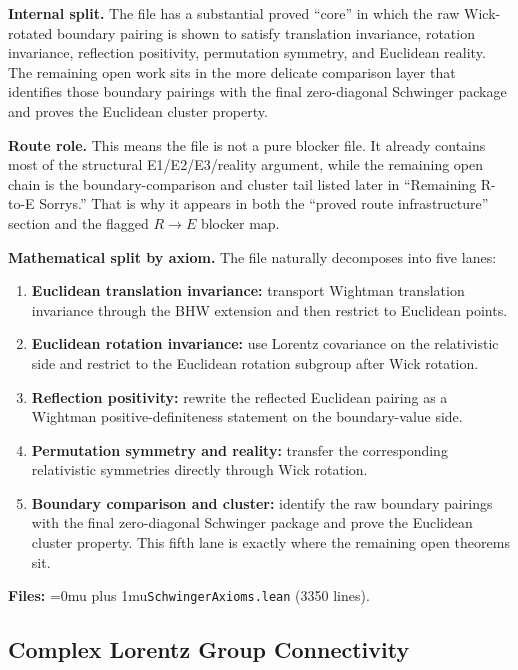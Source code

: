 \documentclass[11pt,a4paper]{article}
\newcommand{\leanname}[1]{\begingroup\Urlmuskip=0mu plus 1mu\relax\nolinkurl{#1}\endgroup}
\begin{document}
\medskip\noindent
\textbf{Internal split.}
The file has a substantial proved ``core'' in which the raw Wick-rotated boundary
pairing is shown to satisfy translation invariance, rotation invariance,
reflection positivity, permutation symmetry, and Euclidean reality. The remaining
open work sits in the more delicate comparison layer that identifies those
boundary pairings with the final zero-diagonal Schwinger package and proves the
Euclidean cluster property.

\medskip\noindent
\textbf{Route role.}
This means the file is not a pure blocker file. It already contains most of the
structural E1/E2/E3/reality argument, while the remaining open chain is the
boundary-comparison and cluster tail listed later in
``Remaining R-to-E Sorrys.'' That is why it appears in both the ``proved route
infrastructure'' section and the flagged $R \to E$ blocker map.

\medskip\noindent
\textbf{Mathematical split by axiom.}
The file naturally decomposes into five lanes:
\begin{enumerate}
\item \textbf{Euclidean translation invariance:} transport Wightman translation
  invariance through the BHW extension and then restrict to Euclidean points.
\item \textbf{Euclidean rotation invariance:} use Lorentz covariance on the
  relativistic side and restrict to the Euclidean rotation subgroup after Wick
  rotation.
\item \textbf{Reflection positivity:} rewrite the reflected Euclidean pairing as
  a Wightman positive-definiteness statement on the boundary-value side.
\item \textbf{Permutation symmetry and reality:} transfer the corresponding
  relativistic symmetries directly through Wick rotation.
\item \textbf{Boundary comparison and cluster:} identify the raw boundary
  pairings with the final zero-diagonal Schwinger package and prove the
  Euclidean cluster property. This fifth lane is exactly where the remaining
  open theorems sit.
\end{enumerate}

\textbf{Files:} \leanname{SchwingerAxioms.lean} (3350 lines).

\subsection{Complex Lorentz Group Connectivity}
\end{document}
